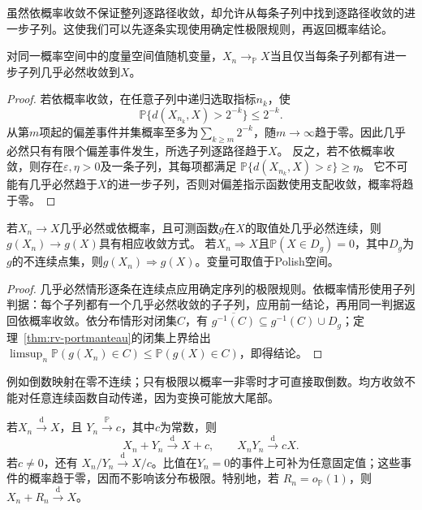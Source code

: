 虽然依概率收敛不保证整列逐路径收敛，却允许从每条子列中找到逐路径收敛的进一步子列。这使我们可以先逐条实现使用确定性极限规则，再返回概率结论。
\begin{lemma}[依概率收敛的子列判据]
 \label{lem:rv-probability-subsequence}
 对同一概率空间中的度量空间值随机变量，\(X_n\to_{\mathbb P}X\)当且仅当每条子列都有进一步子列几乎必然收敛到\(X\)。
\end{lemma}
\begin{proof}
若依概率收敛，在任意子列中递归选取指标\(n_k\)，使
\[
  \mathbb P\{d(X_{n_k},X)>2^{-k}\}\leq2^{-k}.
\]
从第\(m\)项起的偏差事件并集概率至多为\(\sum_{k\geq m}2^{-k}\)，随\(m\to\infty\)趋于零。因此几乎必然只有有限个偏差事件发生，所选子列逐路径趋于\(X\)。
反之，若不依概率收敛，则存在\(\varepsilon,\eta>0\)及一条子列，其每项都满足
\(\mathbb P\{d(X_{n_k},X)>\varepsilon\}\geq\eta\)。
它不可能有几乎必然趋于\(X\)的进一步子列，否则对偏差指示函数使用支配收敛，概率将趋于零。
\end{proof}

\begin{theorem}[连续映射]
\label{thm:rv-continuous-mapping}
若\(X_n\to X\)几乎必然或依概率，且可测函数\(g\)在\(X\)的取值处几乎必然连续，则\(g(X_n)\to g(X)\)具有相应收敛方式。
若\(X_n\Rightarrow X\)且\(\mathbb P(X\in D_g)=0\)，其中\(D_g\)为\(g\)的不连续点集，则\(g(X_n)\Rightarrow g(X)\)。变量可取值于Polish空间。
\end{theorem}
\begin{proof}
几乎必然情形逐条在连续点应用确定序列的极限规则。依概率情形使用子列判据：每个子列都有一个几乎必然收敛的子子列，应用前一结论，再用同一判据返回依概率收敛。依分布情形对闭集\(C\)，有
\(\overline{g^{-1}(C)}\subseteq g^{-1}(C)\cup D_g\)；定理~\ref{thm:rv-portmanteau}的闭集上界给出
\(\limsup_n\mathbb P(g(X_n)\in C)\leq\mathbb P(g(X)\in C)\)，即得结论。
\end{proof}
例如倒数映射在零不连续；只有极限以概率一非零时才可直接取倒数。均方收敛不能对任意连续函数自动传递，因为变换可能放大尾部。
\begin{theorem}[Slutsky定理]
  \label{thm:statistics-slutsky}
  若\(X_n\xrightarrow{\mathrm d}X\)，且
  \(Y_n\xrightarrow{\mathbb{P}}c\)，其中\(c\)为常数，则
  \[
    X_n+Y_n\xrightarrow{\mathrm d}X+c,\qquad
    X_nY_n\xrightarrow{\mathrm d}cX.
  \]
  若\(c\neq0\)，还有
  \(X_n/Y_n\xrightarrow{\mathrm d}X/c\)。比值在\(Y_n=0\)的事件上可补为任意固定值；这些事件的概率趋于零，因而不影响该分布极限。特别地，若
  \(R_n=o_{\mathbb{P}}(1)\)，则
  \(X_n+R_n\xrightarrow{\mathrm d}X\)。
\end{theorem}

